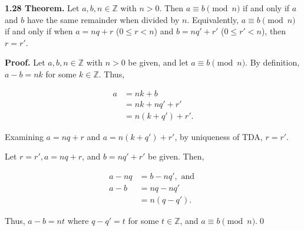 \documentclass[12pt]{article}
\begin{document}
\noindent\textbf{1.28 Theorem.} Let $a,b,n\in\mathbb{Z}$ with $n>0$. Then $a\equiv b\pmod{n}$ if and only if $a$ and $b$ have the same remainder when divided by $n$. Equivalently, $a\equiv b\pmod{n}$ if and only if when $a=nq+r$ ($0\leq r<n$) and $b=nq'+r'$ ($0\leq r'<n$), then $r=r'$.

\bigskip

\noindent\textbf{Proof.} Let $a,b,n\in\mathbb{Z}$ with $n>0$ be given, and let $a\equiv b\pmod{n}$. By definition, $a-b=nk$ for some $k\in\mathbb{Z}$. Thus,

\begin{align*}
a &= nk+b \\
&= nk + nq' + r' \\
&= n(k+q') + r'.
\end{align*}

\noindent Examining $a=nq+r$ and $a=n(k+q')+r'$, by uniqueness of TDA, $r=r'$.

\bigskip

\noindent Let $r=r', a=nq+r$, and $b=nq'+r'$ be given. Then,

\begin{align*}
a-nq &= b-nq', \text{ and } \\
a-b &= nq-nq' \\
&= n(q-q').
\end{align*}

\noindent Thus, $a-b=nt$ where $q-q'=t$ for some $t\in\mathbb{Z}$, and $a\equiv b\pmod{n}$.\qed
\end{document}

